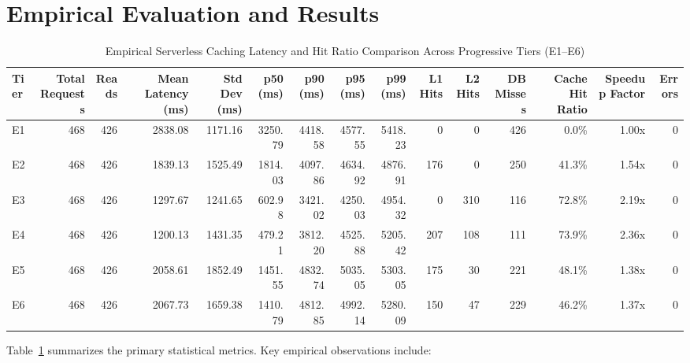 \documentclass[conference]{IEEEtran}
\begin{document}
\section{Empirical Evaluation and Results}

\begin{table}[t]
\centering
\caption{Empirical Serverless Caching Latency and Hit Ratio Comparison Across Progressive Tiers (E1--E6)}
\label{tab:caching_results}
\begin{tabular}{lrrrrrrrrrrrrrr}
\toprule
Tier & Total Requests & Reads & Mean Latency (ms) & Std Dev (ms) & p50 (ms) & p90 (ms) & p95 (ms) & p99 (ms) & L1 Hits & L2 Hits & DB Misses & Cache Hit Ratio & Speedup Factor & Errors \\
\midrule
E1 & 468 & 426 & 2838.08 & 1171.16 & 3250.79 & 4418.58 & 4577.55 & 5418.23 & 0 & 0 & 426 & 0.0\% & 1.00x & 0 \\
E2 & 468 & 426 & 1839.13 & 1525.49 & 1814.03 & 4097.86 & 4634.92 & 4876.91 & 176 & 0 & 250 & 41.3\% & 1.54x & 0 \\
E3 & 468 & 426 & 1297.67 & 1241.65 & 602.98 & 3421.02 & 4250.03 & 4954.32 & 0 & 310 & 116 & 72.8\% & 2.19x & 0 \\
E4 & 468 & 426 & 1200.13 & 1431.35 & 479.21 & 3812.20 & 4525.88 & 5205.42 & 207 & 108 & 111 & 73.9\% & 2.36x & 0 \\
E5 & 468 & 426 & 2058.61 & 1852.49 & 1451.55 & 4832.74 & 5035.05 & 5303.05 & 175 & 30 & 221 & 48.1\% & 1.38x & 0 \\
E6 & 468 & 426 & 2067.73 & 1659.38 & 1410.79 & 4812.85 & 4992.14 & 5280.09 & 150 & 47 & 229 & 46.2\% & 1.37x & 0 \\
\bottomrule
\end{tabular}
\end{table}

Table~\ref{tab:caching_results} summarizes the primary statistical metrics. Key empirical observations include:
\end{document}
